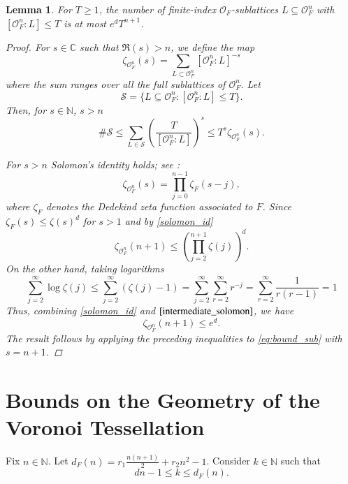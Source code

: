 \documentclass[11pt,a4paper,twoside]{amsart}
\theoremstyle{plain}
\newtheorem{lemma}[theorem]{\bfseries Lemma}
\theoremstyle{definition}
\newcommand{\rint}[0]{\mathcal{O}_F}
\renewcommand{\leq}{\leqslant}
\renewcommand{\geq}{\geqslant}
\begin{document}
\begin{lemma}\label{count_embedded_sublattices}
\label{count_embedded_submodules}
For $T\geq1$, the number of finite-index $\rint$-sublattices $L\subseteq\rint^n$ with $[\rint^n:L]\leq T$ is at most $e^dT^{n+1}$.
\begin{proof}

For $s\in\mathbb{C}$ such that $\mathfrak{R}(s)>n$, we define the map
$$\zeta_{\rint^n}(s) = \sum_{L\subset \rint^n} [\rint^n : L]^{-s}$$
where the sum ranges over all the full sublattices of $\rint^n$. 
Let 
\begin{equation}
\label{eq:bound_sub}
    \mathcal{S} = \{L\subseteq\rint^n:[\rint^n:L]\leq T\}.
\end{equation} Then, for $s\in\mathbb{N}$, $s>n$
$$\# \mathcal{S} \leq  \sum_{L\in \mathcal{S}} \left(\frac{T}{[\rint^n:L]}\right)^s \leq T^s\zeta_{\rint^n}(s).$$

For $s>n$ Solomon's identity holds; see \cite{BushnellReiner1980}:
\begin{equation}
\label{solomon_id}
  \zeta_{\rint^n}(s) = \prod_{j=0}^{n-1}\zeta_F(s-j),  
\end{equation}
where $\zeta_F$ denotes the Dedekind zeta function associated to $F$.
Since $\zeta_F(s)\leq\zeta(s)^d$ for $s>1$ and by \eqref{solomon_id}
\begin{equation}
    \zeta_{\rint^n}(n+1) \leq \left(\prod_{j=2}^{n+1}\zeta(j)\right)^d.
\end{equation}
On the other hand, taking logarithms
\begin{equation}
\label{intermediate_solomon}
\sum_{j=2}^{\infty} \log \zeta(j) \leq \sum_{j=2}^{\infty}(\zeta(j)-1)=\sum_{j = 2}^{\infty}\sum_{r=2}^{\infty} r^{-j}=  \sum_{r=2}^{\infty}\frac{1}{r(r-1)}=1
\end{equation}
Thus, combining \eqref{solomon_id} and $\eqref{intermediate_solomon}$, we have
 $$\zeta_{\rint^n}(n+1) \leq e^d.$$
The result follows by applying the preceding inequalities to \eqref{eq:bound_sub} with $s=n+1$.
\end{proof}
\end{lemma}



\section{Bounds on the Geometry of the Voronoi Tessellation}
Fix $n\in\mathbb{N}$. Let $d_F(n)= r_1\frac{n(n+1)}{2}+r_2n^2-1$. Consider $k\in\mathbb{N}$ such that $$dn-1\leq k\leq d_F(n).$$
\end{document}
